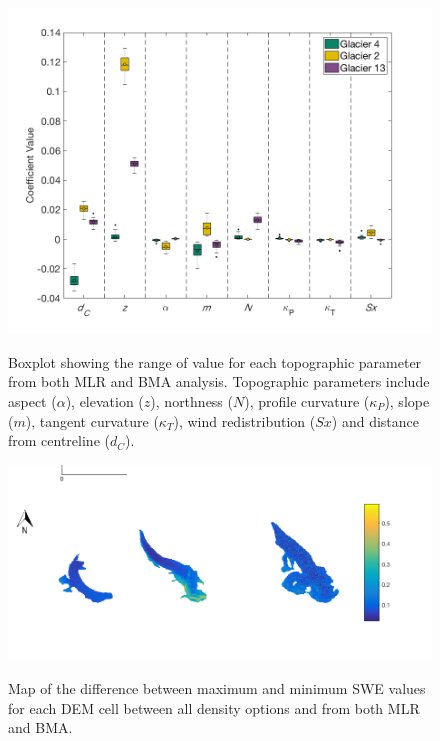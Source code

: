 \documentclass[12pt]{article}
\begin{document}
\begin{figure}[H]
	\centering
	\includegraphics[width =1.1 \textwidth]{Coeff_Compare.png}\\
	\caption{Boxplot showing the range of value for each topographic parameter from both MLR and BMA analysis. Topographic parameters include aspect ($\alpha$), elevation ($z$), northness ($N$), profile curvature ($\kappa_P$), slope ($m$), tangent curvature ($\kappa_T$), wind redistribution ($Sx$) and distance from centreline ($d_C$).}
	\label{fig:allCeoffs_boxplot}
\end{figure} 

\begin{landscape}
\begin{figure}
	\centering
	\includegraphics[height = 0.5\textwidth]{SWEdifferenceMap.png}\\
	\caption{Map of the difference between maximum and minimum SWE values for each DEM cell between all density options and from both MLR and BMA.}
	\label{fig:SWEdiffMap}
\end{figure}
\end{landscape}
	
\pagebreak


\end{document}
